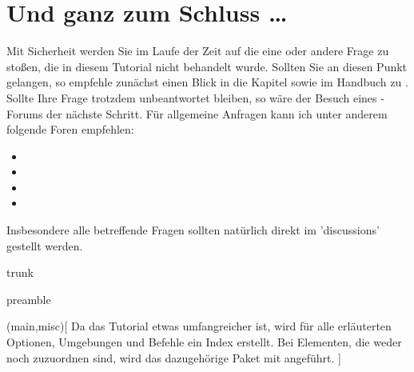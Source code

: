 \documentclass[%
  english,ngerman,%
  cdgeometry=no,DIV=12,%
  cd=false,cdfont=false,cdtitle=true,%
  headings=normal,%
  automark,%
  listof=toc,%
]{tudscrartcl}
\begin{document}
\section{Und ganz zum Schluss \dots}

Mit Sicherheit werden Sie im Laufe der Zeit auf die eine oder andere Frage zu 
 stoßen, die in diesem Tutorial nicht behandelt wurde. Sollten 
Sie an diesen Punkt gelangen, so empfehle zunächst einen Blick in die Kapitel 
sowie  im Handbuch zu 
\TUDScript. Sollte Ihre Frage trotzdem unbeantwortet bleiben, so wäre der 
Besuch eines -Forums der nächste Schritt. Für allgemeine 
Anfragen kann ich unter anderem folgende Foren empfehlen:
%
\begin{itemize}
\item {}
\item {}
\item {}
\item {}
\end{itemize} 

Insbesondere alle \TUDScript betreffende Fragen sollten natürlich direkt im 
\GitHubRepo'discussions' gestellt werden.

\clearpage
\listoffigures
\listoftables

\begin{Code}[nolst]{trunk}
\printbibliography[heading=bibintoc,label=sec:bibliography]
\end{Code}
\clearpage
\printbibliography[heading=bibintoc]

\begin{Code}[nolst]{preamble}
\usepackage[colorlinks,linkcolor=blue]{hyperref}

\end{Code}

\PrintIndex(main,misc)[
Da das Tutorial etwas umfangreicher ist, wird für alle erläuterten Optionen, 
Umgebungen und Befehle ein Index erstellt. Bei Elementen, die weder \TUDScript 
noch \KOMAScript zuzuordnen sind, wird das dazugehörige Paket mit angeführt.
]
\end{document}
